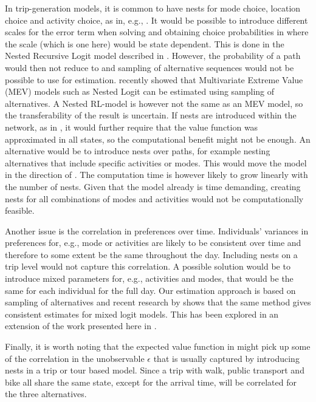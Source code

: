 In trip-generation models, it is common to have nests for mode choice, location choice and activity choice, as in, e.g., \citet{Bowman01}. It would be possible to introduce different scales for the error term when solving  and obtaining choice probabilities in  where the scale (which is one here) would be state dependent. This is done in the Nested Recursive Logit model described in \citet{mai2015}. However, the probability of a path would then not reduce to   and sampling of alternative sequences would not be possible to use for estimation.
\citet{guevara2013MEV} recently showed that Multivariate Extreme Value (MEV) models such as Nested Logit can be estimated using sampling of alternatives. A Nested RL-model is however not the same as an MEV model, so the transferability of the result is uncertain. If nests are introduced within the network, as in \citet{mai2015}, it would further require that the value function was approximated in all states, so the computational benefit might not be enough. An alternative would be to introduce nests over paths, for example nesting alternatives that include specific activities or modes. This would move the model in the direction of \citet{Bowman01}. The computation time is however likely to grow linearly with the number of nests. Given that the model already is time demanding, creating nests for all combinations of modes and activities would not be computationally feasible.

 Another issue is the correlation in preferences over time. Individuals' variances in preferences for, e.g., mode or activities are likely to be consistent over time and therefore to some extent be the same throughout the day. Including nests on a trip level would not capture this correlation. A possible solution would be to introduce mixed parameters for, e.g., activities and modes, that would be the same for each individual for the full day. Our estimation approach is based on sampling of alternatives and recent research by \citet{Guevara13} shows that the same method gives consistent estimates for mixed logit models. This has been explored in an extension of the work presented here in \citep{maelleMixed17}.

Finally, it is worth noting that the expected value function in  might pick up some of the correlation in the unobservable $\epsilon$ that is usually captured by introducing nests in a trip or tour based model. Since a trip with walk, public transport and bike all share the same state, except for the arrival time, \eutil will be correlated for the three alternatives.